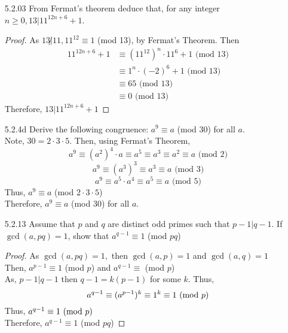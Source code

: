 \documentclass[12pt]{article}
\begin{document}
\begin{enumerate}
	\item[5.2.03] From Fermat's theorem deduce that, for any integer $ n\geq0, 13 | 11^{12n+6}+1 $.
	\begin{proof}
		As $ 13 \not| 11 , 11^{12} \equiv 1 $ (mod 13), by Fermat's Theorem. Then
		\begin{align*}
			11^{12n+6}+1 &\equiv (11^{12})^n\cdot 11^6+1 \text{ (mod 13)}\\
						 &\equiv 1^n\cdot(-2)^6+1 \text{ (mod 13)}\\
						 &\equiv 65\text{ (mod 13)}\\
						 &\equiv 0 \text{ (mod 13)}
		\end{align*}
		Therefore, $  13 | 11^{12n+6}+1 $
	\end{proof}
	\item[5.2.4d] Derive the following congruence: $ a^9 \equiv a $ (mod 30) for all $ a $. \\
	Note, $ 30 = 2\cdot 3 \cdot 5 $. Then, using Fermat's Theorem,
	\[a^9\equiv (a^2)^4\cdot a \equiv a^5\equiv a^3 \equiv a^2 \equiv a \text{ (mod 2)} \]
	\[a^9\equiv (a^3)^3 \equiv a^3 \equiv a \text{ (mod 3)} \]
	\[a^9\equiv a^5\cdot a^4 \equiv a^5 \equiv a \text{ (mod 5)} \]
	Thus, $ a^9 \equiv a $ (mod $ 2\cdot3\cdot5 $)\\
	Therefore, $ a^9 \equiv a $ (mod 30) for all $ a $.
	\item[5.2.13] Assume that $ p $ and $ q $ are distinct odd primes such that $ p-1|q-1 $. If $ \gcd(a,pq)=1 $, show that $ a^{q-1} \equiv 1 $ (mod $ pq $)
	\begin{proof}
		As $ \gcd(a,pq)=1,  $ then $ \gcd(a,p)= 1 $ and $ \gcd(a,q)=1 $
		Then, $ a^{p-1}\equiv 1 $ (mod $ p $) and $ a^{q-1}\equiv $ (mod $ p $)\\
		As, $ p-1|q-1 $ then $ q-1 = k(p-1)$ for some $ k$. Thus, 
		\[a^{q-1}\equiv(a^{p-1})^k\equiv1^k\equiv1\text{ (mod $ p $)} \]
		Thus, $ a^{q-1}\equiv 1 \text{ (mod $ p $) }$\\
		Therefore, $ a^{q-1} \equiv 1 $ (mod $ pq $)
	\end{proof}
	
	
	

\end{enumerate}
\end{document}
